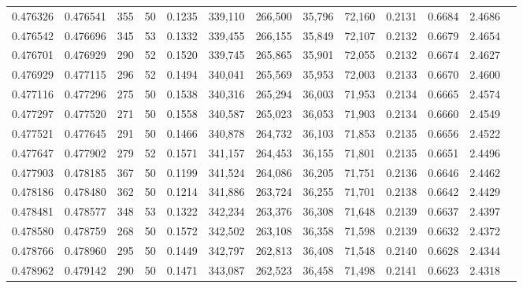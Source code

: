 \begin{tabular}{rrrrrrrrrrrrr}
0.476326 & 0.476541 &   355 &  50 &                                     0.1235 & 339,110 & 266,500 &  35,796 &  72,160 & 0.2131 & 0.6684 & 2.4686 \\
0.476542 & 0.476696 &   345 &  53 &                                     0.1332 & 339,455 & 266,155 &  35,849 &  72,107 & 0.2132 & 0.6679 & 2.4654 \\
0.476701 & 0.476929 &   290 &  52 &                                     0.1520 & 339,745 & 265,865 &  35,901 &  72,055 & 0.2132 & 0.6674 & 2.4627 \\
0.476929 & 0.477115 &   296 &  52 &                                     0.1494 & 340,041 & 265,569 &  35,953 &  72,003 & 0.2133 & 0.6670 & 2.4600 \\
0.477116 & 0.477296 &   275 &  50 &                                     0.1538 & 340,316 & 265,294 &  36,003 &  71,953 & 0.2134 & 0.6665 & 2.4574 \\
0.477297 & 0.477520 &   271 &  50 &                                     0.1558 & 340,587 & 265,023 &  36,053 &  71,903 & 0.2134 & 0.6660 & 2.4549 \\
0.477521 & 0.477645 &   291 &  50 &                                     0.1466 & 340,878 & 264,732 &  36,103 &  71,853 & 0.2135 & 0.6656 & 2.4522 \\
0.477647 & 0.477902 &   279 &  52 &                                     0.1571 & 341,157 & 264,453 &  36,155 &  71,801 & 0.2135 & 0.6651 & 2.4496 \\
0.477903 & 0.478185 &   367 &  50 &                                     0.1199 & 341,524 & 264,086 &  36,205 &  71,751 & 0.2136 & 0.6646 & 2.4462 \\
0.478186 & 0.478480 &   362 &  50 &                                     0.1214 & 341,886 & 263,724 &  36,255 &  71,701 & 0.2138 & 0.6642 & 2.4429 \\
0.478481 & 0.478577 &   348 &  53 &                                     0.1322 & 342,234 & 263,376 &  36,308 &  71,648 & 0.2139 & 0.6637 & 2.4397 \\
0.478580 & 0.478759 &   268 &  50 &                                     0.1572 & 342,502 & 263,108 &  36,358 &  71,598 & 0.2139 & 0.6632 & 2.4372 \\
0.478766 & 0.478960 &   295 &  50 &                                     0.1449 & 342,797 & 262,813 &  36,408 &  71,548 & 0.2140 & 0.6628 & 2.4344 \\
0.478962 & 0.479142 &   290 &  50 &                                     0.1471 & 343,087 & 262,523 &  36,458 &  71,498 & 0.2141 & 0.6623 & 2.4318 \\

\end{tabular}
